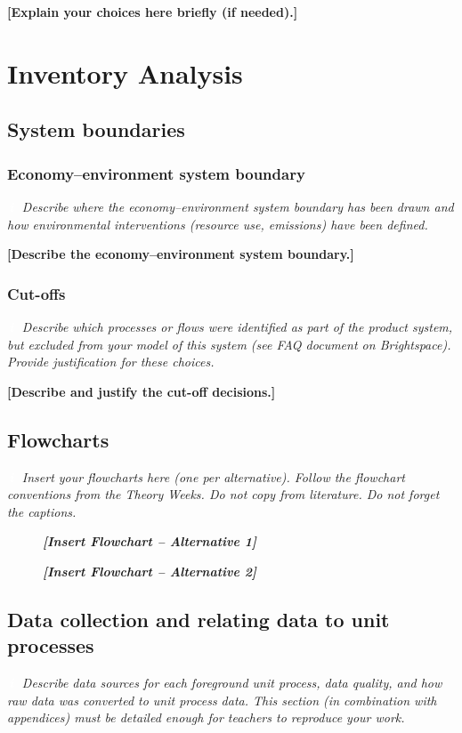 \documentclass[10pt]{article}
\newcommand{\placeholder}[1]{\textcolor{lcaph}{\textbf{#1}}}    %
\newcommand{\placeholderit}[1]{\textcolor{lcaph}{\textit{#1}}}  %
\newcommand{\infoicon}{{\setlength{\fboxsep}{1pt}\colorbox{lcablue}{\textcolor{white}{\upshape\bfseries\,i\,}}}}
\newcommand{\guidance}[1]{\par\noindent\colorbox{lcabox}{\parbox{\dimexpr\linewidth-2\fboxsep}{\setlength{\parskip}{2pt}\small\itshape\infoicon\ \color{lcatext}#1}}\par}
\begin{document}
\placeholder{[Explain your choices here briefly (if needed).]}

\section{Inventory Analysis}
\subsection{System boundaries}
\subsubsection{Economy--environment system boundary}
\guidance{Describe where the economy--environment system boundary has been drawn and how environmental interventions (resource use, emissions) have been defined.}

\placeholder{[Describe the economy--environment system boundary.]}

\subsubsection{Cut-offs}
\guidance{Describe which processes or flows were identified as part of the product system, but excluded from your model of this system (see FAQ document on Brightspace). Provide justification for these choices.}

\placeholder{[Describe and justify the cut-off decisions.]}

\subsection{Flowcharts}
\guidance{Insert your flowcharts here (one per alternative). Follow the flowchart conventions from the Theory Weeks. Do not copy from literature. Do not forget the captions.}

\begin{figure}[H]
    \placeholder{\textit{[Insert Flowchart -- Alternative 1]}}
    \caption{\placeholderit{}}
    \label{fig:flowchart-alt1}
\end{figure}

\begin{figure}[H]
    \placeholder{\textit{[Insert Flowchart -- Alternative 2]}}
    \caption{\placeholderit{}}
    \label{fig:flowchart-alt2}
\end{figure}

\subsection{Data collection and relating data to unit processes}
\guidance{Describe data sources for each foreground unit process, data quality, and how raw data was converted to unit process data. This section (in combination with appendices) must be detailed enough for teachers to reproduce your work.}
\end{document}
